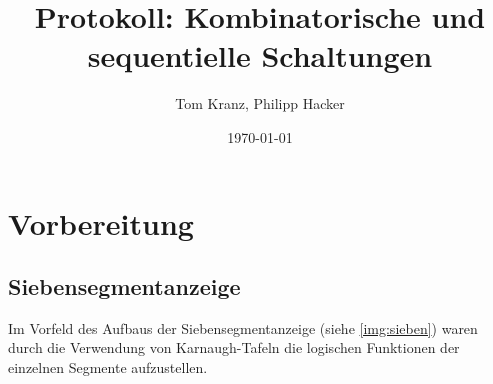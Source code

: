\documentclass[numbers=noenddot,12pt,a4paper]{scrartcl}
\title{Protokoll: Kombinatorische und sequentielle Schaltungen}
\author{Tom Kranz, Philipp Hacker}
\date{\today}
\begin{document}
\maketitle
\vspace*{\fill}
\tableofcontents
\vfill
\newpage
\section{Vorbereitung}
\subsection{Siebensegmentanzeige}
Im Vorfeld des Aufbaus der Siebensegmentanzeige (siehe \ref{img:sieben}) waren durch die Verwendung von Karnaugh-Tafeln die logischen Funktionen der einzelnen Segmente aufzustellen.
\end{document}
